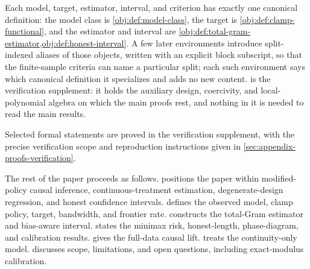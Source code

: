 Each model, target, estimator, interval, and criterion has exactly one canonical definition: the model class is \cref{obj:def:model-class}, the target is \cref{obj:def:clamp-functional}, and the estimator and interval are \cref{obj:def:total-gram-estimator,obj:def:honest-interval}. A few later environments introduce split-indexed aliases of those objects, written with an explicit block subscript, so that the finite-sample criteria can name a particular split; each such environment says which canonical definition it specializes and adds no new content.  is the verification supplement: it holds the auxiliary design, coercivity, and local-polynomial algebra on which the main proofs rest, and nothing in it is needed to read the main results.

Selected formal statements are proved in the verification supplement, with the precise verification scope and reproduction instructions given in \cref{sec:appendix-proofs-verification}.

The rest of the paper proceeds as follows.  positions the paper within modified-policy causal inference, continuous-treatment estimation, degenerate-design regression, and honest confidence intervals.  defines the observed model, clamp policy, target, bandwidth, and frontier rate.  constructs the total-Gram estimator and bias-aware interval.  states the minimax risk, honest-length, phase-diagram, and calibration results.  gives the full-data causal lift.  treats the continuity-only model.  discusses scope, limitations, and open questions, including exact-modulus calibration.

